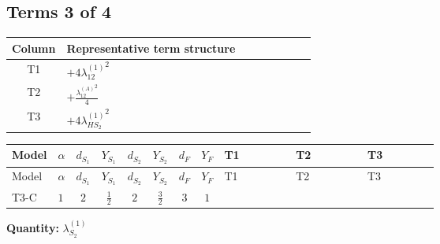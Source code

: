 \documentclass[8pt]{article}
\begin{document}
\begin{landscape}
\subsection*{Terms 3 of 4}
\begin{center}
\begin{tabular}{@{}c >{\raggedright\arraybackslash}p{0.82\linewidth}@{}}
\toprule
Column & Representative term structure \\
\midrule
T1 & \(\displaystyle +4 {\lambda_{12}^{(1)}}^2\) \\
\midrule
T2 & \(\displaystyle +\frac{{\lambda_{12}^{(A)}}^2}{4}\) \\
\midrule
T3 & \(\displaystyle +4 {\lambda_{HS_2}^{(1)}}^2\) \\
\midrule
\bottomrule
\end{tabular}
\end{center}
\smallskip
\tiny
\begin{longtable}{@{}llcccccc >{\raggedright\arraybackslash}p{0.21\linewidth} >{\raggedright\arraybackslash}p{0.21\linewidth} >{\raggedright\arraybackslash}p{0.21\linewidth}@{}}
\toprule
Model & $\alpha$ & $d_{S_1}$ & $Y_{S_1}$ & $d_{S_2}$ & $Y_{S_2}$ & $d_F$ & $Y_F$ & T1 & T2 & T3 \\
\midrule
\endfirsthead
\toprule
Model & $\alpha$ & $d_{S_1}$ & $Y_{S_1}$ & $d_{S_2}$ & $Y_{S_2}$ & $d_F$ & $Y_F$ & T1 & T2 & T3 \\
\midrule
\endhead
T3-C & $1$ & $2$ & $\frac{1}{2}$ & $2$ & $\frac{3}{2}$ & $3$ & $1$ & \scriptsize\adjustbox{max width=\linewidth}{$\begin{gathered} +4 {\lambda_{12}^{(1)}}^2\end{gathered}$} & \scriptsize\adjustbox{max width=\linewidth}{$\begin{gathered} +\frac{{\lambda_{12}^{(A)}}^2}{4}\end{gathered}$} & \scriptsize\adjustbox{max width=\linewidth}{$\begin{gathered} +4 {\lambda_{HS_2}^{(1)}}^2\end{gathered}$} \\
\midrule
\bottomrule
\end{longtable}
\clearpage
\noindent\textbf{Quantity: }$\lambda_{S_2}^{(1)}$\par\smallskip

\end{landscape}
\end{document}
